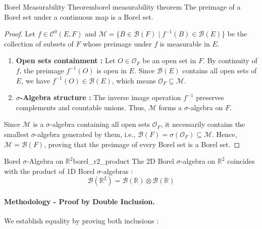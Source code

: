 \begin{theorem}{Borel Measurability Theorem}{borel measurability theorem}
The preimage of a Borel set under a continuous map is a Borel set.
\end{theorem}

\begin{proof}
Let $f \in \mathcal{C}^0(E, F)$ and $\mathcal{M} = \{ B \in \mathcal{B}(F) \mid f^{-1}(B) \in \mathcal{B}(E) \}$ be the collection of subsets of $F$ whose preimage under $f$ is measurable in $E$.
\begin{enumerate}[label=(\roman*)]
    \item \textbf{Open sets containment :} Let $O \in \mathcal{O}_F$ be an open set in $F$. By continuity of $f$, the preimage $f^{-1}(O)$ is open in $E$. Since $\mathcal{B}(E)$ contains all open sets of $E$, we have $f^{-1}(O) \in \mathcal{B}(E)$, which means $\mathcal{O}_F \subseteq \mathcal{M}$.
    \item \textbf{$\sigma$-Algebra structure :} The inverse image operation $f^{-1}$ preserves complements and countable unions. Thus, $\mathcal{M}$ forms a $\sigma$-algebra on $F$.
\end{enumerate}
Since $\mathcal{M}$ is a $\sigma$-algebra containing all open sets $\mathcal{O}_F$, it necessarily contains the smallest $\sigma$-algebra generated by them, i.e., $\mathcal{B}(F) = \sigma(\mathcal{O}_F) \subseteq \mathcal{M}$. Hence, $\mathcal{M} = \mathcal{B}(F)$, proving that the preimage of every Borel set is a Borel set.
\end{proof}


\begin{example}{Borel $\sigma$-Algebra on $\mathbb{R}^2$}{borel_r2_product}
The 2D Borel $\sigma$-algebra on $\mathbb{R}^2$ coincides with the product of 1D Borel $\sigma$-algebras :
\[
    \mathcal{B}(\mathbb{R}^2) = \mathcal{B}(\mathbb{R}) \otimes \mathcal{B}(\mathbb{R})
\]
\end{example}
\vspace{5em}
\paragraph{Methodology - Proof by Double Inclusion.} We establish equality by proving both inclusions :


